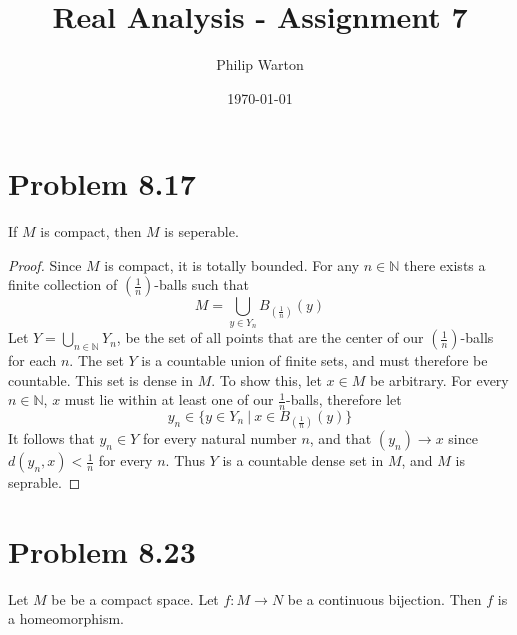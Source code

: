 \documentclass{article}
\theoremstyle{definition}
\begin{document}
\title{Real Analysis - Assignment 7}
\author{Philip Warton}
\date{\today}
\maketitle

\section*{Problem 8.17}
    \begin{mdframed}[align=center]
        If $M$ is compact, then $M$ is seperable.
    \end{mdframed}

    \begin{proof}
        Since $M$ is compact, it is totally bounded. For any $n \in \mathbb{N}$ there exists a finite
        collection of $(\frac{1}{n})$-balls such that $$M = \bigcup_{y\in Y_n} B_{(\frac{1}{n})}(y)$$
        Let $Y = \bigcup_{n \in \mathbb{N}} Y_n$, be the set of all points that are the center of our $(\frac{1}{n})$-balls for each $n$.
        The set $Y$ is a countable union of finite sets, and must therefore be countable. This set is dense in $M$.
        To show this, let $x \in M$ be arbitrary. For every $n \in \mathbb{N}$, $x$ must lie within at least one of our $\frac{1}{n}$-balls,
        therefore let $$y_n \in \{y \in Y_n \ | \ x \in B_{(\frac{1}{n})}(y)\}$$ It follows that $y_n \in Y$ for every natural number $n$, and that
        $(y_n) \rightarrow x$ since $d(y_n,x) < \frac{1}{n}$ for every $n$. Thus $Y$ is a countable dense set in $M$, and $M$ is seprable.
    \end{proof}
    
\section*{Problem 8.23}
    \begin{mdframed}
        Let $M$ be be a compact space. Let $f: M \rightarrow N$ be a continuous bijection.
        Then $f$ is a homeomorphism.
    \end{mdframed}
\end{document}
